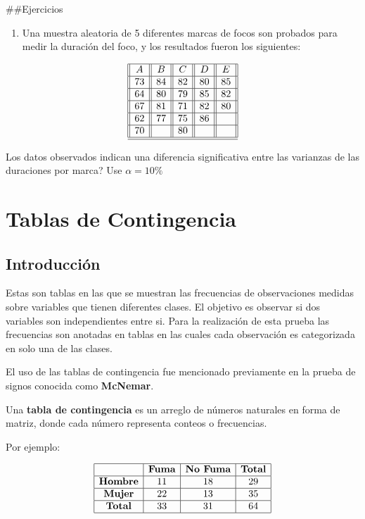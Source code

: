 \documentclass[
  a4paper,
  oneside,
  openany]{book}
\providecommand{\tightlist}{%
  \setlength{\itemsep}{0pt}\setlength{\parskip}{0pt}}
\begin{document}
\#\#Ejercicios

\begin{enumerate}
\def\labelenumi{\arabic{enumi}.}
\tightlist
\item
  Una muestra aleatoria de 5 diferentes marcas de focos son probados para medir la duración del foco, y los resultados fueron los siguientes:
\end{enumerate}

\[
\begin{array}{||c| |c| |c| |c||c||} 
\hline 
A & B&C&D&E \\ 
 \hline
73&84&82&80&85\\
 \hline
64&80&79&85&82\\
 \hline
67&81&71&82&80\\
 \hline
62&77&75&86&\\
 \hline
70&&80&&\\
\hline
\hline
\end{array}
\]

Los datos observados indican una diferencia significativa entre las varianzas de las duraciones por marca? Use \(\alpha=10\%\)

\hypertarget{part-tablas-de-contingencia}{%
\part{Tablas de Contingencia}\label{part-tablas-de-contingencia}}

\hypertarget{introducciuxf3n-2}{%
\chapter*{Introducción}\label{introducciuxf3n-2}}


Estas son tablas en las que se muestran las frecuencias de observaciones medidas sobre variables que tienen diferentes clases. El objetivo es observar si dos variables son independientes entre si. Para la realización de esta prueba las frecuencias son anotadas en tablas en las cuales cada observación es categorizada en solo una de las clases.

El uso de las tablas de contingencia fue mencionado previamente en la prueba de signos conocida como \textbf{McNemar}.

Una \textbf{tabla de contingencia} es un arreglo de números naturales en forma de matriz, donde cada número representa conteos o frecuencias.

Por ejemplo:

\[
\begin{array}{|c|c|c|c|} 
\hline
&\textbf{Fuma} &\textbf{No Fuma} &\textbf{Total}\\
\hline
\textbf{Hombre} &11 &18 &29\\
\hline
\textbf{Mujer} &22 &13 &35\\
\hline
\textbf{Total}& 33& 31 &64\\
\hline
\end{array}
\]
\end{document}
